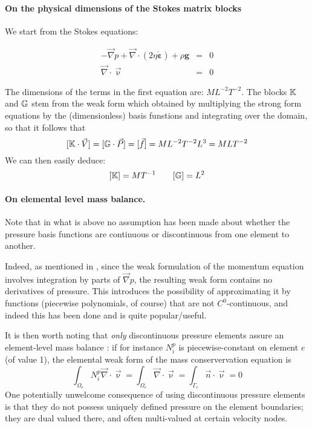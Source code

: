 \paragraph{On the physical dimensions of the Stokes matrix blocks}

We start from the Stokes equations:

\begin{eqnarray}
- {\vec \nabla p} + {\vec \nabla} \cdot (2 \eta \dot{\bm \varepsilon} ) + \rho {\bm g} &=& 0  \\
\vec \nabla \cdot \vec \upnu &=& 0 
\end{eqnarray}

The dimensions of the terms in the first equation are: $ML^{-2}T^{-2}$. The blocks ${\mathbb{K}}$ and ${\mathbb{G}}$
stem from the weak form which obtained by multiplying the strong form equations by the (dimensionless)
basis funstions and integrating over the domain, so that it follows that 
\[
[ {\mathbb{K}} \cdot \vec V] = [{\mathbb{G}} \cdot \vec P] = [\vec f] = ML^{-2}T^{-2} L^3 = MLT^{-2} 
\]
We can then easily deduce:
\[
[{\mathbb{K}}]=MT^{-1}
\quad
\quad
[{\mathbb{G}}]=L^2
\]

\paragraph{On elemental level mass balance.}

Note that in what is above no assumption has been made about whether 
the pressure basis functions are continuous or discontinuous from one 
element to another. 

Indeed, as mentioned in \cite{grsa}, since the 
weak formulation of the momentum equation involves
integration by parts of ${\vec \nabla }p$, the resulting weak form contains 
no derivatives of pressure. This introduces the possibility of approximating it
by functions (piecewise polynomials, of course) that are not $C^0$-continuous, 
and indeed this has been done and is quite popular/useful. 

It is then worth noting that {\sl only} discontinuous pressure 
elements assure an element-level mass balance \cite{grsa}:
if for instance $N_i^p$ is piecewise-constant on element $e$ (of value 1), the 
elemental weak form of the mass conservervation equation is 
\[
\int_{\Omega_e} N_i^p {\vec \nabla} \cdot {\vec \upnu} = 
\int_{\Omega_e} {\vec \nabla} \cdot {\vec \upnu} = 
\int_{\Gamma_e} {\vec n} \cdot {\vec \upnu} = 0
\]
One potentially unwelcome consequence of using 
discontinuous pressure elements is that they 
do not possess uniquely defined pressure 
on the element boundaries; they are dual valued there, 
and often multi-valued at certain velocity nodes. 

